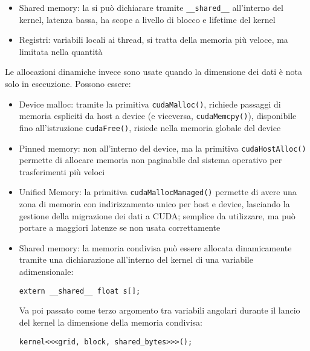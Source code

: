 \begin{questions}
\begin{solution}
\begin{itemize}
            \item Shared memory: la si può dichiarare tramite \texttt{\_\_shared\_\_} all'interno del kernel, latenza bassa, ha scope a livello di blocco e lifetime del kernel
            
            \item Registri: variabili locali ai thread, si tratta della memoria più veloce, ma limitata nella quantità
        \end{itemize}
        
        Le allocazioni dinamiche invece sono usate quando la dimensione dei dati è nota solo in esecuzione. Possono essere:
        \begin{itemize}
            \item Device malloc: tramite la primitiva \texttt{cudaMalloc()}, richiede passaggi di memoria espliciti da host a device (e viceversa, \texttt{cudaMemcpy()}), disponibile fino all'istruzione \texttt{cudaFree()}, risiede nella memoria globale del device
            
            \item Pinned memory: non all'interno del device, ma la primitiva \texttt{cudaHostAlloc()} permette di allocare memoria non paginabile dal sistema operativo per trasferimenti più veloci
            
            \item Unified Memory: la primitiva \texttt{cudaMallocManaged()} permette di avere una zona di memoria con indirizzamento unico per host e device, lasciando la gestione della migrazione dei dati a CUDA; semplice da utilizzare, ma può portare a maggiori latenze se non usata correttamente
            
            \item Shared memory: la memoria condivisa può essere allocata dinamicamente tramite una dichiarazione all'interno del kernel di una variabile adimensionale:
            \begin{verbatim}
extern __shared__ float s[];
            \end{verbatim}
            Va poi passato come terzo argomento tra variabili angolari durante il lancio del kernel la dimensione della memoria condivisa:
            \begin{verbatim}
kernel<<<grid, block, shared_bytes>>>();
            \end{verbatim}
        \end{itemize}
    \end{solution}
    

\end{questions}
